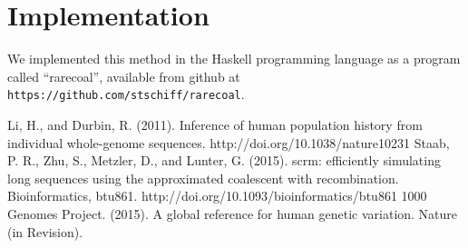 \documentclass[a4paper]{article}
\begin{document}
\section{Implementation}

We implemented this method in the Haskell programming language as a program called ``rarecoal'', available from github at \texttt{https://github.com/stschiff/rarecoal}.



\begin{thebibliography}{1}
	 Li, H., and Durbin, R. (2011). Inference of human population history from individual whole-genome sequences. http://doi.org/10.1038/nature10231
     Staab, P. R., Zhu, S., Metzler, D., and Lunter, G. (2015). scrm: efficiently simulating long sequences using the approximated coalescent with recombination. Bioinformatics, btu861. http://doi.org/10.1093/bioinformatics/btu861
     1000 Genomes Project. (2015). A global reference for human genetic variation. Nature (in Revision).
\end{thebibliography}
\end{document}
